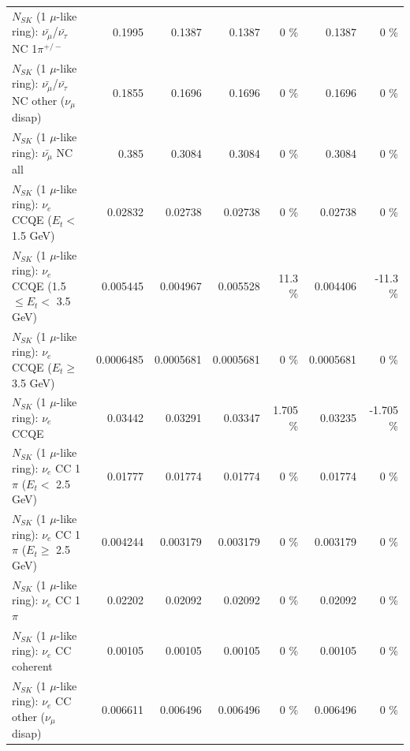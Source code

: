 \begin{table}
\begin{tabular}{| l | r | r | r  r | r  r |}
\hline
  $N_{SK}$ (1 $\mu$-like ring): $\bar{\nu_\mu}$/$\bar{\nu_\tau}$ NC 1$\pi^{+/-}$ &          0.1995 &          0.1387 &          0.1387 &        0 \%  &          0.1387 &        0 \%  \\ 
$N_{SK}$ (1 $\mu$-like ring): $\bar{\nu_\mu}$/$\bar{\nu_\tau}$ NC other ($\nu_\mu$ disap) &          0.1855 &          0.1696 &          0.1696 &        0 \%  &          0.1696 &        0 \%  \\ 
                          $N_{SK}$ (1 $\mu$-like ring): $\bar{\nu_{\mu}}$ NC all &           0.385 &          0.3084 &          0.3084 &        0 \%  &          0.3084 &        0 \%  \\ 
\hline
\hline
\hline
                  $N_{SK}$ (1 $\mu$-like ring): $\nu_e$ CCQE ($E_{t} <$ 1.5 GeV) &         0.02832 &         0.02738 &         0.02738 &        0 \%  &         0.02738 &        0 \%  \\ 
         $N_{SK}$ (1 $\mu$-like ring): $\nu_e$ CCQE (1.5 $\leq E_{t} <$ 3.5 GeV) &        0.005445 &        0.004967 &        0.005528 &     11.3 \%  &        0.004406 &    -11.3 \%  \\ 
               $N_{SK}$ (1 $\mu$-like ring): $\nu_e$ CCQE ($E_{t} \geq$ 3.5 GeV) &       0.0006485 &       0.0005681 &       0.0005681 &        0 \%  &       0.0005681 &        0 \%  \\ 
\hline
                                      $N_{SK}$ (1 $\mu$-like ring): $\nu_e$ CCQE &         0.03442 &         0.03291 &         0.03347 &    1.705 \%  &         0.03235 &   -1.705 \%  \\ 
\hline
             $N_{SK}$ (1 $\mu$-like ring): $\nu_e$ CC 1$\pi$ ($E_{t} <$ 2.5 GeV) &         0.01777 &         0.01774 &         0.01774 &        0 \%  &         0.01774 &        0 \%  \\ 
          $N_{SK}$ (1 $\mu$-like ring): $\nu_e$ CC 1$\pi$ ($E_{t} \geq$ 2.5 GeV) &        0.004244 &        0.003179 &        0.003179 &        0 \%  &        0.003179 &        0 \%  \\ 
\hline
                                 $N_{SK}$ (1 $\mu$-like ring): $\nu_e$ CC 1$\pi$ &         0.02202 &         0.02092 &         0.02092 &        0 \%  &         0.02092 &        0 \%  \\ 
                               $N_{SK}$ (1 $\mu$-like ring): $\nu_e$ CC coherent &         0.00105 &         0.00105 &         0.00105 &        0 \%  &         0.00105 &        0 \%  \\ 
                $N_{SK}$ (1 $\mu$-like ring): $\nu_e$ CC other ($\nu_\mu$ disap) &        0.006611 &        0.006496 &        0.006496 &        0 \%  &        0.006496 &        0 \%  \\ 

\end{tabular}
\end{table}
